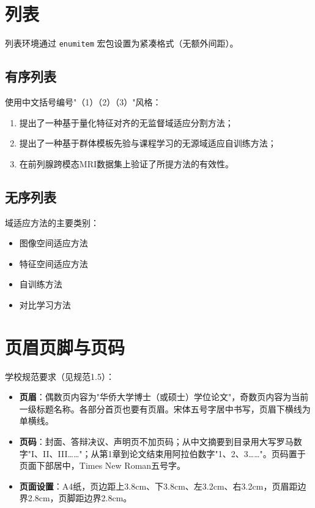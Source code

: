 \section{列表}\label{sec:demo-lists}

列表环境通过 \verb|enumitem| 宏包设置为紧凑格式（无额外间距）。

\subsection{有序列表}\label{subsec:demo-ordered}

使用中文括号编号"（1）（2）（3）"风格：
\begin{enumerate}[label=（\arabic*）]
  \item 提出了一种基于量化特征对齐的无监督域适应分割方法；
  \item 提出了一种基于群体模板先验与课程学习的无源域适应自训练方法；
  \item 在前列腺跨模态MRI数据集上验证了所提方法的有效性。
\end{enumerate}

\subsection{无序列表}\label{subsec:demo-unordered}

域适应方法的主要类别：
\begin{itemize}
  \item 图像空间适应方法
  \item 特征空间适应方法
  \item 自训练方法
  \item 对比学习方法
\end{itemize}

\section{页眉页脚与页码}\label{sec:demo-header-footer}

学校规范要求（见规范1.5）：

\begin{itemize}
  \item \textbf{页眉}：偶数页内容为"华侨大学博士（或硕士）学位论文"，奇数页内容为当前一级标题名称。各部分首页也要有页眉。宋体五号字居中书写，页眉下横线为单横线。
  \item \textbf{页码}：封面、答辩决议、声明页不加页码；从中文摘要到目录用大写罗马数字"I、II、III……"；从第1章到论文结束用阿拉伯数字"1、2、3……"。页码置于页面下部居中，Times New Roman五号字。
  \item \textbf{页面设置}：A4纸，页边距上3.8cm、下3.8cm、左3.2cm、右3.2cm，页眉距边界2.8cm，页脚距边界2.8cm。
\end{itemize}

